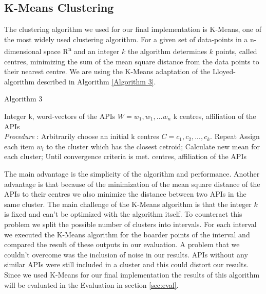 \documentclass[a4paper]{IEEEtran}
\begin{document}
\subsection{K-Means Clustering}
The clustering algorithm we used for our final implementation is K-Means, one of the most widely used clustering algorithm. For a given set of data-points in a n-dimensional space R\textsuperscript{n} and an integer $k$ the algorithm determines $k$ points, called centres, minimizing the sum of the mean square distance from the data points to their nearest centre. We are using the K-Means adaptation of the Lloyed-algorithm described in Algorithm \ref{Algorithm 3}\cite{kanungo2002efficient}.

\begin{algorithm}[H]
 \caption{Algorithm 3}
 \begin{algorithmic}[1]
\renewcommand{\algorithmicrequire}{\textbf{Input:}}
 \renewcommand{\algorithmicensure}{\textbf{Output:}}
 \REQUIRE Integer k, \newline word-vectors of the APIs $W={w_1, w_1, ... w_n}$
 \ENSURE  k centres, affiliation of the APIs
 \\ \textit{Procedure} :
  \STATE Arbitrarily choose an initial k centres $C = {c_1, c_2, ..., c_k}$.
 \STATE Repeat \newline
\noindent\hspace*{5mm}%
			Assign each item $w_i$ to the cluster which has \newline 
\noindent\hspace*{5mm}%
			the closest cetroid;\newline
\noindent\hspace*{5mm}%
			Calculate new mean for each cluster;\newline
	Until convergence criteria is met.
\RETURN centres, affiliation of the APIs
 \end{algorithmic}
 \end{algorithm}



The main advantage is the simplicity of the algorithm and performance. Another advantage is that because of the minimization of the mean square distance of the APIs to their centres we also minimize the distance between two APIs in the same cluster.
The main challenge of the K-Means algorithm is that the integer $k$ is fixed and can’t be optimized with the algorithm itself. To counteract this problem we split the possible number of clusters into intervals. For each interval we executed the K-Means algorithm for the boarder points of the interval and compared the result of these outputs in our evaluation.
A problem that we couldn’t overcome was the inclusion of noise in our results. APIs without any similar APIs were still included in a cluster and this could distort our results.
Since we used K-Means for our final implementation the results of this algorithm will be evaluated in the Evaluation in section \ref{sec:eval}.
\end{document}
